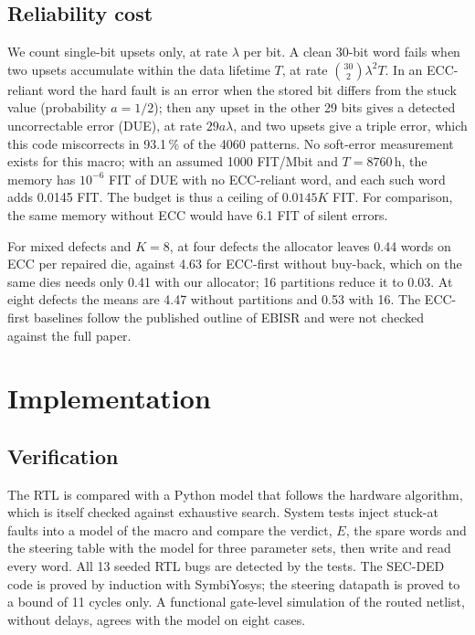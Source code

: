 \documentclass[conference]{IEEEtran}
\begin{document}
\subsection{Reliability cost}
We count single-bit upsets only, at rate $\lambda$ per bit. A clean 30-bit word fails when two upsets
accumulate within the data lifetime $T$, at rate $\binom{30}{2}\lambda^2T$. In an ECC-reliant word the
hard fault is an error when the stored bit differs from the stuck value (probability $a=1/2$); then
any upset in the other 29 bits gives a detected uncorrectable error (DUE), at rate $29a\lambda$, and
two upsets give a triple error, which this code miscorrects in 93.1\,\% of the 4060 patterns. No
soft-error measurement exists for this macro; with an assumed 1000 FIT/Mbit and $T=8760$\,h, the
memory has $10^{-6}$ FIT of DUE with no ECC-reliant word, and each such word adds 0.0145 FIT. The
budget is thus a ceiling of $0.0145K$ FIT. For comparison, the same memory without ECC would have
6.1 FIT of silent errors.

For mixed defects and $K=8$, at four defects the allocator leaves 0.44 words on ECC per repaired die,
against 4.63 for ECC-first without buy-back, which on the same dies needs only 0.41 with our
allocator; 16 partitions reduce it to 0.03. At eight defects the means are 4.47 without partitions and
0.53 with 16. The ECC-first baselines follow the published outline of EBISR \cite{lu2016} and were not
checked against the full paper.

\section{Implementation}\label{sec:impl}
\subsection{Verification}
The RTL is compared with a Python model that follows the hardware algorithm, which is itself checked
against exhaustive search. System tests inject stuck-at faults into a model of the macro and compare
the verdict, $E$, the spare words and the steering table with the model for three parameter sets, then
write and read every word. All 13 seeded RTL bugs are detected by the tests. The SEC-DED code is
proved by induction with SymbiYosys; the steering datapath is proved to a bound of 11 cycles only.
A functional gate-level simulation of the routed netlist, without delays, agrees with the model on
eight cases.
\end{document}
